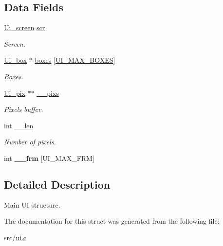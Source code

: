 \subsection*{Data Fields}
\begin{DoxyCompactItemize}
\item 
\mbox{\label{struct__Ui_abd7c2a78bbdbe0e91a47a1461660b747}} 
\hyperlink{struct__Ui__screen}{Ui\+\_\+screen} \hyperlink{struct__Ui_abd7c2a78bbdbe0e91a47a1461660b747}{scr}
\begin{DoxyCompactList}\small\item\em Screen. \end{DoxyCompactList}\item 
\mbox{\label{struct__Ui_ab4d33275d1afe8817a640653ab4b6848}} 
\hyperlink{struct__Ui__box}{Ui\+\_\+box} $\ast$ \hyperlink{struct__Ui_ab4d33275d1afe8817a640653ab4b6848}{boxes} \mbox{[}\hyperlink{ui_8c_a1be73fb0e5253951bdb7f2a4bd6a1524}{U\+I\+\_\+\+M\+A\+X\+\_\+\+B\+O\+X\+ES}\mbox{]}
\begin{DoxyCompactList}\small\item\em Boxes. \end{DoxyCompactList}\item 
\mbox{\label{struct__Ui_a11af896bffe4bdbeca5ca871f7a9b7f0}} 
\hyperlink{struct__Ui__pix}{Ui\+\_\+pix} $\ast$$\ast$ \hyperlink{struct__Ui_a11af896bffe4bdbeca5ca871f7a9b7f0}{\+\_\+\+\_\+pixs}
\begin{DoxyCompactList}\small\item\em Pixels buffer. \end{DoxyCompactList}\item 
\mbox{\label{struct__Ui_a368b423615ed2b6852c1ca99fd6351ce}} 
int \hyperlink{struct__Ui_a368b423615ed2b6852c1ca99fd6351ce}{\+\_\+\+\_\+len}
\begin{DoxyCompactList}\small\item\em Number of pixels. \end{DoxyCompactList}\item 
\mbox{\label{struct__Ui_a7d91f1a00c9d6eec76e588ee55b8697d}} 
int {\bfseries \+\_\+\+\_\+frm} \mbox{[}U\+I\+\_\+\+M\+A\+X\+\_\+\+F\+RM\mbox{]}
\end{DoxyCompactItemize}


\subsection{Detailed Description}
Main UI structure. 

The documentation for this struct was generated from the following file\+:\begin{DoxyCompactItemize}
\item 
src/\hyperlink{ui_8c}{ui.\+c}\end{DoxyCompactItemize}
